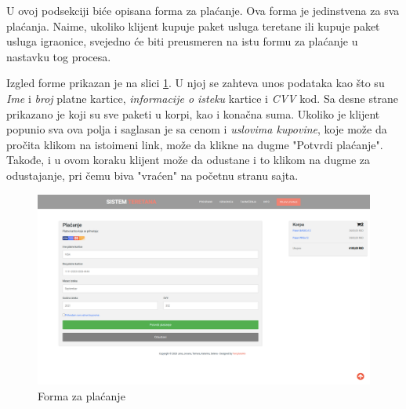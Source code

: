 \documentclass[../main.tex]{subfiles}
\begin{document}
U ovoj podsekciji biće opisana forma za plaćanje. Ova forma je jedinstvena za sva plaćanja. Naime, ukoliko klijent kupuje paket usluga teretane ili kupuje paket usluga igraonice, svejedno će biti preusmeren na istu formu za plaćanje u nastavku tog procesa.

Izgled forme prikazan je na slici \ref{fig:forma}. U njoj se zahteva unos podataka kao što su \textit{Ime} i \textit{broj} platne kartice, \textit{informacije o isteku} kartice i \textit{CVV} kod. Sa desne strane prikazano je koji su sve paketi u korpi, kao i konačna suma. Ukoliko je klijent popunio sva ova polja i saglasan je sa cenom i \textit{uslovima kupovine}, koje može da pročita klikom na istoimeni link, može da klikne na dugme "Potvrdi plaćanje". Takođe, i u ovom koraku klijent može da odustane i to klikom na dugme za odustajanje, pri čemu biva "vraćen" na početnu stranu sajta.

\begin{figure}[!ht]
\begin{center}
\includegraphics[scale=0.22]{sections/korisnicki_interfejs/screenshots/forma_za_placanje.png}
\end{center}
\caption{Forma za plaćanje}
\label{fig:forma}
\end{figure}
\end{document}
